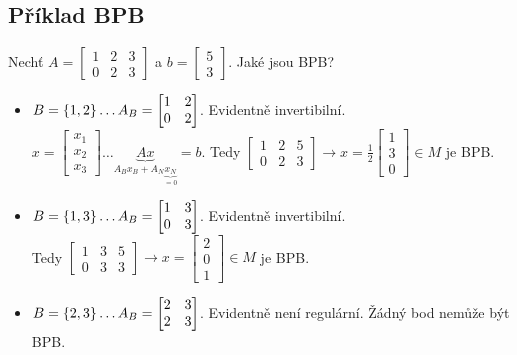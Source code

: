 \subsection{Příklad BPB}
Nechť
$A =
    \begin{bmatrix}
        1 & 2 & 3 \\
        0 & 2 & 3
    \end{bmatrix}
$ a $b =
    \begin{bmatrix}
        5 \\
        3
    \end{bmatrix}
$. Jaké jsou BPB?
\begin{itemize}
    \item $B = \left\lbrace 1,2 \right\rbrace \dots A_B =
    \begin{bmatrix}
        1 & 2 \\
        0 & 2
    \end{bmatrix}$. Evidentně invertibilní. \\
    $x =
    \begin{bmatrix}
    x_1 \\
    x_2 \\
    x_3
    \end{bmatrix} \dots \underbrace{Ax}_{A_B x_B +  A_N\underbrace{x_N}_{=0}}=b$. Tedy
    $\left[
        \begin{array}{cc|c}
        1 & 2 & 5 \\
        0 & 2 & 3
        \end{array}
    \right]
    \rightarrow x = \frac{1}{2}
    \begin{bmatrix}
        1 \\
        3 \\
        0
    \end{bmatrix} \in M$ je BPB.
    \item $B = \left\lbrace 1,3 \right\rbrace \dots A_B =
    \begin{bmatrix}
        1 & 3 \\
        0 & 3
    \end{bmatrix}$. Evidentně invertibilní. \\
    Tedy
    $\left[
        \begin{array}{cc|c}
        1 & 3 & 5 \\
        0 & 3 & 3
        \end{array}
    \right]
    \rightarrow x =
    \begin{bmatrix}
        2 \\
        0 \\
        1
    \end{bmatrix} \in M$ je BPB.
    \item $B = \left\lbrace 2,3 \right\rbrace \dots A_B =
    \begin{bmatrix}
        2 & 3 \\
        2 & 3
    \end{bmatrix}$. Evidentně není regulární. Žádný bod nemůže být BPB.
\end{itemize}

